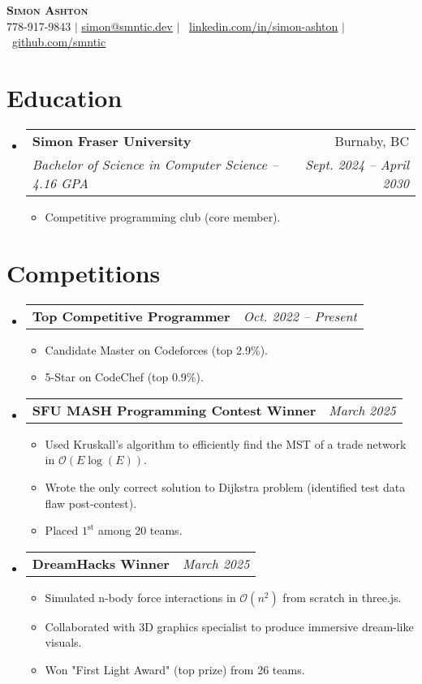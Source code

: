 \documentclass[letterpaper,11pt]{article}
\makeatletter
\newcommand{\resumeItem}[1]{
  \item\small{
    {#1 \vspace{-2pt}}
  }
}
\newcommand{\resumeSubheading}[5]{
  \vspace{-2pt}\item
    \begin{tabular*}{0.97\textwidth}[t]{l@{\extracolsep{\fill}}r}
      \textbf{#1} & #2 \\
      \textit{\small#3} & \textit{\small #4} \\
    \end{tabular*}
    \if\relax\detokenize{#5}\relax\else
      #5
    \fi
    \vspace{-7pt}
}
\newcommand{\resumeProjectHeading}[2]{
    \item
    \begin{tabular*}{0.97\textwidth}{l@{\extracolsep{\fill}}r}
      \small#1 & \textit{#2} \\
    \end{tabular*}\vspace{-7pt}
}
\newcommand{\resumeSubHeadingListStart}{\begin{itemize}[leftmargin=0.15in, label={}]}
\newcommand{\resumeSubHeadingListEnd}{\end{itemize}}
\newcommand{\resumeItemListStart}{\begin{itemize}[leftmargin=0.23in]}
\newcommand{\resumeItemListEnd}{\end{itemize}\vspace{-5pt}}
\newcommand{\bigO}{\mathcal{O}}
\makeatother
\begin{document}
\begin{center}
    \textbf{\Huge \scshape Simon Ashton} \\ \vspace{5pt}
    \small 778-917-9843 $|$ \href{mailto:simon@smntic.dev}{\underline{simon@smntic.dev}} $|$ 
    \raisebox{-0.05em}{\faLinkedin}\
    \href{https://linkedin.com/in/simon-ashton}{\underline{linkedin.com/in/simon-ashton}} $|$
    \raisebox{-0.1em}{\faGithub}\
    \href{https://github.com/smntic}{\underline{github.com/smntic}}
\end{center}


\section{Education}
  \resumeSubHeadingListStart
    \resumeSubheading
      {Simon Fraser University}{Burnaby, BC}
      {Bachelor of Science in Computer Science -- 4.16 GPA}{Sept. 2024 -- April 2030}
      \resumeItemListStart
        \resumeItem{Competitive programming club (core member).}
      \resumeItemListEnd
  \resumeSubHeadingListEnd


\section{Competitions}
    \resumeSubHeadingListStart
      \resumeProjectHeading
          {\textbf{Top Competitive Programmer}}{Oct. 2022 -- Present}
          \resumeItemListStart
            \resumeItem{Candidate Master on Codeforces (top 2.9\%).}
            \resumeItem{5-Star on CodeChef (top 0.9\%).}
          \resumeItemListEnd
      \resumeProjectHeading
          {\textbf{SFU MASH Programming Contest Winner}}{March 2025}
          \resumeItemListStart
            \resumeItem{Used Kruskall's algorithm to efficiently find the MST of a trade network in $\bigO(E \log(E))$.}
            \resumeItem{Wrote the only correct solution to Dijkstra problem (identified test data flaw post-contest).}
            \resumeItem{Placed $1^\text{st}$ among 20 teams.}
          \resumeItemListEnd
      \resumeProjectHeading
          {\textbf{DreamHacks Winner}}{March 2025}
          \resumeItemListStart
            \resumeItem{Simulated n-body force interactions in $\bigO(n^2)$ from scratch in three.js.}
            \resumeItem{Collaborated with 3D graphics specialist to produce immersive dream-like visuals.}
            \resumeItem{Won "First Light Award" (top prize) from 26 teams.}
          \resumeItemListEnd
    \resumeSubHeadingListEnd
\end{document}
